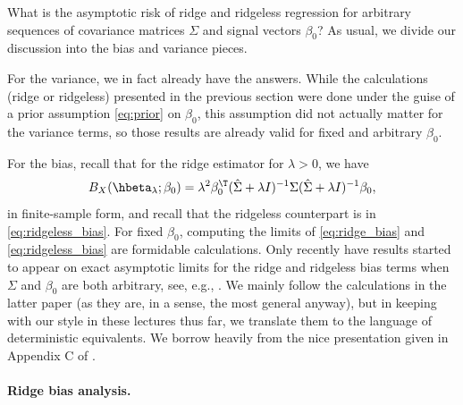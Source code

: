 \documentclass{article}
\begin{document}
What is the asymptotic risk of ridge and ridgeless regression for arbitrary
sequences of covariance matrices $\Sigma$ and signal vectors $\beta_0$? 
As usual, we divide our discussion into the bias and variance pieces. 

For the variance, we in fact already have the answers. While the calculations
(ridge or ridgeless) presented in the previous section were done under the guise
of a prior assumption \eqref{eq:prior} on $\beta_0$, this assumption did not 
actually matter for the variance terms, so those results are already valid for
fixed and arbitrary $\beta_0$.

For the bias, recall that for the ridge estimator  for $\lambda>0$, we have 
\begin{equation}
\label{eq:ridge_bias}
B_X(\hbeta_\lambda; \beta_0) = \lambda^2 \beta_0^\T (\hSigma + \lambda
I)^{-1} \Sigma (\hSigma + \lambda I)^{-1} \beta_0,
\end{equation}
in finite-sample form, and recall that the ridgeless counterpart is in  
\eqref{eq:ridgeless_bias}. For fixed $\beta_0$, computing the limits of
\eqref{eq:ridge_bias} and \eqref{eq:ridgeless_bias} are formidable
calculations. Only recently have results started to appear on exact asymptotic
limits for the ridge and ridgeless bias terms when $\Sigma$ and $\beta_0$ are
both arbitrary, see, e.g., \citet{wu2020optimal, richards2021asymptotics,
  hastie2022surprises}. We mainly follow the calculations in the latter paper
(as they are, in a sense, the most general anyway), but in keeping with our
style in these lectures thus far,  we translate them to the language of
deterministic equivalents. We borrow heavily from the nice presentation given in
Appendix C of \citet{patil2022facets}.    

\paragraph{Ridge bias analysis.}
\end{document}
